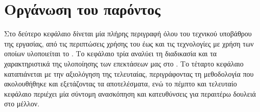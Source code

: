\section{Οργάνωση του παρόντος}

Στο δεύτερο κεφάλαιο δίνεται μία πλήρης περιγραφή όλου του τεχνικού υποβάθρου
της εργασίας, από τις περιπτώσεις χρήσης του  έως και τις τεχνολογίες
με χρήση των οποίων υλοποιείται το \viofs{}. Το κεφάλαιο τρία αναλύει τη
διαδικασία και τα χαρακτηριστικά της υλοποίησης των επεκτάσεων μας στο \osv{}.
Το τέταρτο κεφάλαιο καταπιάνεται με την αξιολόγηση της τελευταίας, περιγράφοντας
τη μεθοδολογία που ακολουθήθηκε και εξετάζοντας τα αποτελέσματα, ενώ το πέμπτο
και τελευταίο κεφάλαιο περιέχει μία σύντομη ανασκόπηση και κατευθύνσεις για
περαιτέρω δουλειά στο μέλλον.
